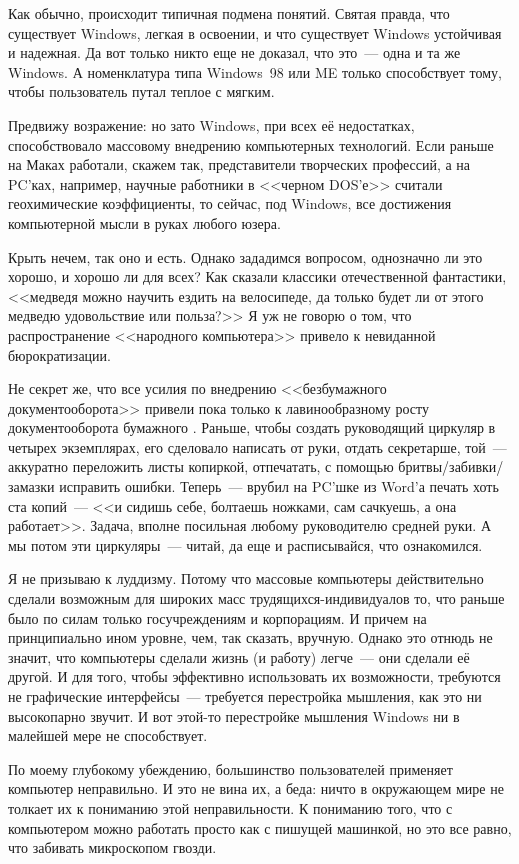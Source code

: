 Как обычно, происходит типичная подмена понятий. Святая правда, что существует Windows, легкая в освоении, и что существует Windows устойчивая и надежная. Да вот только никто еще не доказал, что это~--- одна и та же Windows. А номенклатура типа Windows~98 или ME только способствует тому, чтобы пользователь путал теплое с мягким. 

Предвижу возражение: но зато Windows, при всех её недостатках, способствовало массовому внедрению компьютерных технологий. Если раньше на Маках работали, скажем так, представители творческих профессий, а на PC'ках, например, научные работники в <<черном DOS'е>> считали геохимические коэффициенты, то сейчас, под Windows, все достижения компьютерной мысли в руках любого юзера. 

Крыть нечем, так оно и есть. Однако зададимся вопросом, однозначно ли это хорошо, и хорошо ли для всех? Как сказали классики отечественной фантастики, <<медведя можно научить ездить на велосипеде, да только будет ли от этого медведю удовольствие или польза?>> Я уж не говорю о том, что распространение <<народного компьютера>> привело к невиданной бюрократизации.

Не секрет же, что все усилия по внедрению <<безбумажного документооборота>> привели пока только к лавинообразному росту документооборота бумажного . Раньше, чтобы создать руководящий циркуляр в четырех экземплярах, его сделовало написать от руки, отдать секретарше, той~--- аккуратно переложить листы копиркой, отпечатать, с помощью бритвы/забивки/замазки исправить ошибки. Теперь~--- врубил на PC'шке из Word'а печать хоть ста копий~--- <<и сидишь себе, болтаешь ножками, сам сачкуешь, а она работает>>. Задача, вполне посильная любому руководителю средней руки. А мы потом эти циркуляры~--- читай, да еще и расписывайся, что ознакомился. 

Я не призываю к луддизму. Потому что массовые компьютеры действительно сделали возможным для широких масс трудящихся-индивидуалов то, что раньше было по силам только госучреждениям и корпорациям. И причем на принципиально ином уровне, чем, так сказать, вручную. Однако это отнюдь не значит, что компьютеры сделали жизнь (и работу) легче~--- они сделали её другой. И для того, чтобы эффективно использовать их возможности, требуются не графические интерфейсы~--- требуется перестройка мышления, как это ни высокопарно звучит. И вот этой-то перестройке мышления Windows ни в малейшей мере не способствует. 

По моему глубокому убеждению, большинство пользователей применяет компьютер неправильно. И это не вина их, а беда: ничто в окружающем мире не толкает их к пониманию этой неправильности. К пониманию того, что с компьютером можно работать просто как с пишущей машинкой, но это все равно, что забивать микроскопом гвозди.

